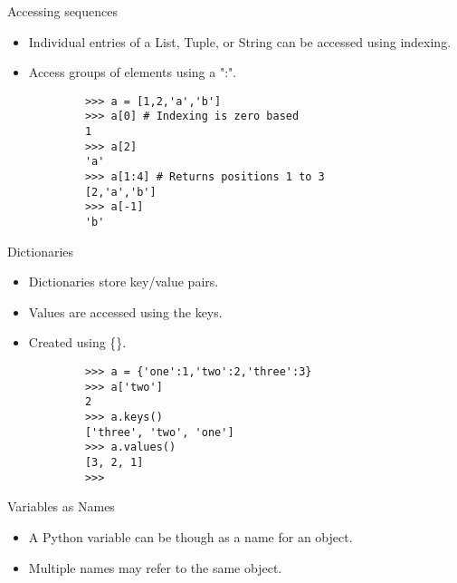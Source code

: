 \documentclass[serif,xcolor=pdftex,dvipsnames,table,hyperref={bookmarks=false,breaklinks}]{beamer}
\begin{document}
\begin{frame}[t,fragile]{Accessing sequences}
	\begin{itemize}[<+->]
		\item Individual entries of a List, Tuple, or String can be accessed using indexing.
		\item Access groups of elements using a ":".
	\end{itemize}

	\pause
	\begin{tcolorbox}
		\begin{verbatim}
			>>> a = [1,2,'a','b']
			>>> a[0] # Indexing is zero based
			1
			>>> a[2]
			'a'
			>>> a[1:4] # Returns positions 1 to 3
			[2,'a','b']
			>>> a[-1]
			'b'
		\end{verbatim}
	\end{tcolorbox}

\end{frame}

\begin{frame}[t,fragile]{Dictionaries}
	\begin{itemize}[<+->]
		\item Dictionaries store key/value pairs.
		\item Values are accessed using the keys.
		\item Created using \{\}.
	\end{itemize}

	\pause
	\begin{tcolorbox}
		\begin{verbatim}
			>>> a = {'one':1,'two':2,'three':3}
			>>> a['two']
			2
			>>> a.keys()
			['three', 'two', 'one']
			>>> a.values()
			[3, 2, 1]
			>>>
		\end{verbatim}
	\end{tcolorbox}
\end{frame}

\begin{frame}[t]{Variables as Names}
	\begin{itemize}[<+->]
		\item A Python variable can be though as a name for an object.
		\item Multiple names may refer to the same object.
	\end{itemize}
\end{frame}

\begin{frame}[t]{Variables as Names}
    \centering
    \texttt{[image: \{../Figures/variable\_as\_names]}.pdf}
\end{frame}
\end{document}
